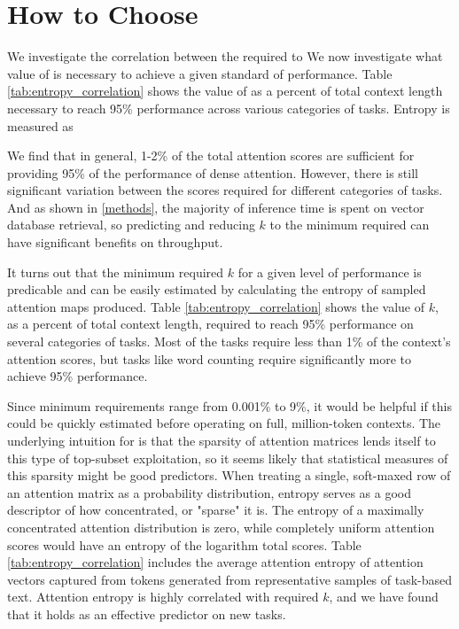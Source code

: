 \section{How to Choose \kk}
\label{how_to_choose_k}

We investigate the correlation between the \kk required to  
We now investigate what value of \kk is necessary to achieve a given standard of performance. Table \ref{tab:entropy_correlation} shows the value of \kk as a percent of total context length necessary to reach 95\% performance across various categories of tasks. Entropy is measured as 

We find that in general, 1-2\% of the total attention scores are sufficient for providing 95\% of the performance of dense attention. However, there is still significant variation between the scores required for different categories of tasks. And as shown in \ref{methods}, the majority of inference time is spent on vector database retrieval, so predicting and reducing $k$ to the minimum required can have significant benefits on throughput.

It turns out that the minimum required $k$ for a given level of performance is predicable and can be easily estimated by calculating the entropy of sampled attention maps produced.  Table \ref{tab:entropy_correlation} shows the value of $k$, as a percent of total context length, required to reach 95\% performance on several categories of tasks. Most of the tasks require less than 1\% of the context's attention scores, but tasks like word counting require significantly more to achieve 95\% performance. 

Since minimum requirements range from 0.001\% to 9\%, it would be helpful if this could be quickly estimated before operating on full, million-token contexts. The underlying intuition for \topk is that the sparsity of attention matrices lends itself to this type of top-subset exploitation, so it seems likely that statistical measures of this sparsity might be good predictors. When treating a single, soft-maxed row of an attention matrix as a probability distribution, entropy serves as a good descriptor of how concentrated, or "sparse" it is. The entropy of a maximally concentrated attention distribution is zero, while completely uniform attention scores would have an entropy of the logarithm total scores. Table \ref{tab:entropy_correlation} includes the average attention entropy of attention vectors captured from tokens generated from representative samples of task-based text. Attention entropy is highly correlated with required $k$, and we have found that it holds as an effective predictor on new tasks. 

